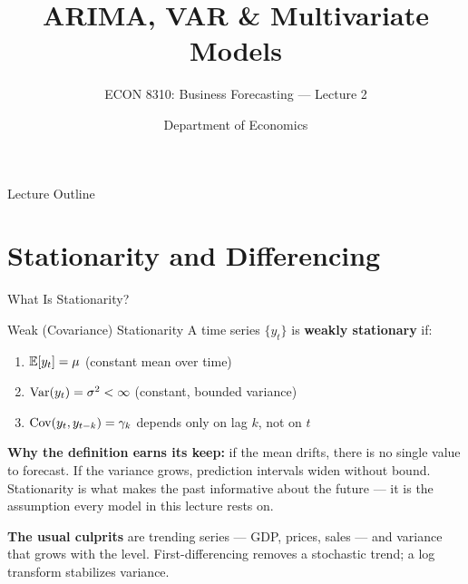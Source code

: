\documentclass[aspectratio=169, 11pt]{beamer}
\title[ARIMA, VAR \& Multivariate]{ARIMA, VAR \& Multivariate Models}
\subtitle{ECON 8310: Business Forecasting --- Lecture 2}
\author{Department of Economics}
\institute{University of Nebraska at Omaha}
\begin{document}

\begin{frame}
  \titlepage
\end{frame}

\begin{frame}{Lecture Outline}
  \tableofcontents
\end{frame}

\section{Stationarity and Differencing}


\begin{frame}{What Is Stationarity?}
  \begin{definitionbox}{Weak (Covariance) Stationarity}
    A time series $\{y_t\}$ is \textbf{weakly stationary} if:
    \begin{enumerate}\small\itemsep1pt
      \item $\mathbb{E}[y_t] = \mu$ \quad (constant mean over time)
      \item $\operatorname{Var}(y_t) = \sigma^2 < \infty$ \quad (constant, bounded variance)
      \item $\operatorname{Cov}(y_t, y_{t-k}) = \gamma_k$ depends only on lag $k$, not on $t$
    \end{enumerate}
  \end{definitionbox}
  \textbf{Why the definition earns its keep:} if the mean drifts, there is no single
  value to forecast. If the variance grows, prediction intervals widen without bound.
  Stationarity is what makes the past informative about the future --- it is the
  assumption every model in this lecture rests on.

  \vspace{0.15cm}
  \textbf{The usual culprits} are trending series --- GDP, prices, sales --- and variance
  that grows with the level. First-differencing removes a stochastic trend; a log
  transform stabilizes variance.

  \vspace{0.1cm}
\end{frame}
\end{document}
